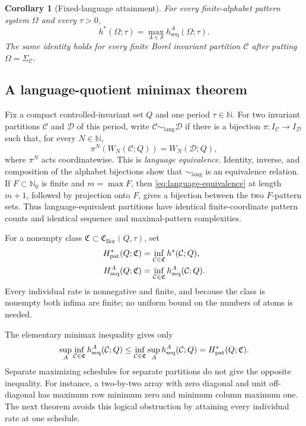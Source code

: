 \documentclass[11pt,reqno]{amsart}
\numberwithin{equation}{section}
\newtheorem{corollary}[theorem]{Corollary}
\theoremstyle{definition}
\newcommand{\N}{\mathbb N}
\newcommand{\Nzero}{\mathbb N_0}
\newcommand{\C}{\mathcal C}
\newcommand{\D}{\mathcal D}
\newcommand{\hseq}{h_{\mathrm{seq}}}
\newcommand{\hpat}{h^{*}}
\newcommand{\Bor}{\mathrm{Bor}}
\newcommand{\lang}{\mathrm{lang}}
\begin{document}
\begin{corollary}[Fixed-language attainment]\label{cor:fixed}
For every finite-alphabet pattern system $\Omega$ and every $\tau>0$,
\begin{equation}\label{eq:fixed-attainment}
 \hpat(\Omega;\tau)=\max_{A\in\mathscr S}\hseq^A(\Omega;\tau).
\end{equation}
The same identity holds for every finite Borel invariant partition $\C$ after
putting $\Omega=\Sigma_\C$.
\end{corollary}


\subsection{A language-quotient minimax theorem}\label{sec:minimax}

Fix a compact controlled-invariant set $Q$ and one period $\tau\in\N$.
For two invariant partitions $\C$ and $\D$ of this period, write
$\C\sim_{\lang}\D$ if there is a bijection
$\pi:I_\C\to I_\D$ such that, for every $N\in\N$,
\begin{equation}\label{eq:language-equivalence}
 \pi^N(W_N(\C;Q))=W_N(\D;Q),
\end{equation}
where $\pi^N$ acts coordinatewise.  This is \emph{language equivalence}.
Identity, inverse, and composition of the alphabet bijections show that
$\sim_{\lang}$ is an equivalence relation.  If $F\subset\Nzero$ is finite and
$m=\max F$, then \eqref{eq:language-equivalence} at length $m+1$, followed by
projection onto $F$, gives a bijection between the two $F$-pattern sets.
Thus language-equivalent partitions have identical finite-coordinate pattern
counts and identical sequence and maximal-pattern complexities.

For a nonempty class $\mathfrak C\subset\mathfrak C_{\Bor}(Q,\tau)$, set
\begin{align}
 H_{\rm pat}^*(Q;\mathfrak C)
 &=\inf_{\C\in\mathfrak C}\hpat(\C;Q),
 \label{eq:system-pattern}\\
 H_{\rm seq}^A(Q;\mathfrak C)
 &=\inf_{\C\in\mathfrak C}\hseq^A(\C;Q).
 \label{eq:system-sequence}
\end{align}
Every individual rate is nonnegative and finite, and because the class is nonempty both
infima are finite; no uniform bound on the numbers of atoms is needed.

The elementary minimax inequality gives only
\begin{align*}
 \sup_A\inf_{\C\in\mathfrak C}\hseq^A(\C;Q)
 \le\inf_{\C\in\mathfrak C}\sup_A\hseq^A(\C;Q)
 =H_{\rm pat}^*(Q;\mathfrak C).
\end{align*}
Separate maximizing schedules for separate partitions do not give the
opposite inequality. For instance, a two-by-two array with zero diagonal
and unit off-diagonal has maximum row minimum zero and minimum column
maximum one. The next theorem avoids this logical obstruction by
attaining every individual rate at one schedule.
\end{document}
